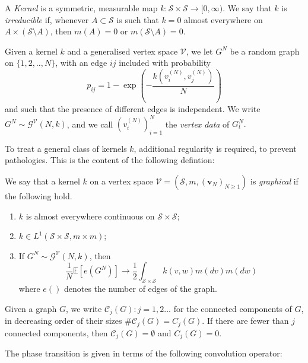 \begin{definition}
    A \emph{Kernel} is a symmetric, measurable map $k: \mathcal{S}\times \mathcal{S} \rightarrow [0, \infty).$ We say that $k$ is \emph{irreducible} if, whenever $A\subset \mathcal{S}$ is such that $k=0$ almost everywhere on $A\times (\mathcal{S}\setminus A)$, then $m(A)=0$ or $m(\mathcal{S}\setminus A)=0$. 
    \end{definition} \begin{definition}\label{definition of GN} Given a kernel $k$ and a generalised vertex space $\mathcal{V}$, we let
    $G^N$ be a random graph on $\{1, 2,..,N\}$, with an edge $ij$ included with probability \begin{equation}
        p_{ij}=1-\exp\left(-\frac{k(v^{(N)}_i,v^{(N)}_j)}{N} \right)
    \end{equation} and such that the presence of different edges is independent. We write $G^N\sim\mathcal{G}^\mathcal{V}(N,k)$, and we call $(v^{(N)}_i)_{i=1}^N$ the \emph{vertex data} of $G^N_t.$
\end{definition} To treat a general class of kernels $k$, additional regularity is required, to prevent pathologies. This is the content of the following defintion: \begin{definition}
    We say that a kernel $k$ on a vertex space $\mathcal{V}=(\mathcal{S}, m, (\mathbf{v}_N)_{N\geq 1})$ is \emph{graphical} if the following hold. 
    \begin{enumerate}[label=\roman{*}).]
        \item $k$ is almost everywhere continuous on $\mathcal{S}\times\mathcal{S};$
        \item $k \in L^1(\mathcal{S}\times \mathcal{S}, m \times m)$;
        \item If $G^N \sim \mathcal{G}^\mathcal{V}(N,k)$, then
        \begin{equation}
            \frac{1}{N}\mathbb{E}\left[e\left(G^N\right)\right]\rightarrow \frac{1}{2}\int_{\mathcal{S}\times \mathcal{S}} k(v,w)m(dv)m(dw)
        \end{equation} where $e()$ denotes the number of edges of the graph.
    \end{enumerate}
\end{definition}  \begin{definition}
 Given a graph $G$, we write $\mathcal{C}_j(G): j=1, 2...$ for the connected components of $G$, in decreasing order of their sizes $\#\mathcal{C}_j(G)=C_j(G)$. If there are fewer than $j$ connected components, then $\mathcal{C}_j(G)=\emptyset$ and $C_j(G)=0$.
\end{definition}The phase transition is given in terms of the following convolution operator:
